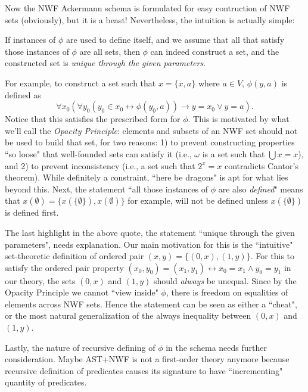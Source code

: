 \documentclass{article}
\begin{document}
Now the NWF Ackermann schema is formulated for easy contruction of NWF sets (obviously), but it is a beast! Nevertheless, the intuition is actually simple:

\begin{displayquote}
If instances of $\phi$ are used to define itself, and we assume that all that satisfy those instances of $\phi$ are all sets, then $\phi$ can indeed construct a set, and the constructed set is \textit{unique through the given parameters}.
\end{displayquote}

For example, to construct a set such that $x=\{x, a\}$ where $a \in V$, $\phi(y, a)$ is defined as $$\forall x_0 (\forall y_0 (y_0 \in x_0 \leftrightarrow \phi(y_0, a)) \rightarrow y = x_0 \vee y = a).$$ Notice that this satisfies the prescribed form for $\phi$. This is motivated by what we'll call the \textit{Opacity Principle}: elements and subsets of an NWF set should not be used to build that set, for two reasons: 1) to prevent constructing properties ``so loose" that well-founded sets can satisfy it (i.e., $\omega$ is a set such that $\bigcup x = x$), and 2) to prevent inconsistency (i.e., a set such that $2^x = x$ contradicts Cantor's theorem). While definitely a constraint, ``here be dragons" is apt for what lies beyond this. Next, the statement ``all those instances of $\phi$ are also \textit{defined}" means that $x(\emptyset) = \{x(\{\emptyset\}), x(\emptyset)\}$ for example, will not be defined unless $x(\{\emptyset\})$ is defined first.

The last highlight in the above quote, the statement ``unique through the given parameters", needs explanation. Our main motivation for this is the ``intuitive" set-theoretic definition of ordered pair $(x,y) = \{(0,x), (1, y)\}$. For this to satisfy the ordered pair property $(x_0,y_0) = (x_1, y_1) \leftrightarrow x_0 = x_1 \wedge y_0 = y_1$ in our theory, the sets $(0,x)$ and $(1,y)$ should \textit{always} be unequal. Since by the Opacity Principle we cannot ``view inside" $\phi$, there is freedom on equalities of elements across NWF sets. Hence the statement can be seen as either a ``cheat", or the most natural generalization of the always inequality between $(0,x)$ and $(1,y)$.

Lastly, the nature of recursive defining of $\phi$ in the schema needs further consideration. Maybe \textsf{AST+NWF} is not a first-order theory anymore because recursive definition of predicates causes its signature to have ``incrementing" quantity of predicates.
\end{document}
